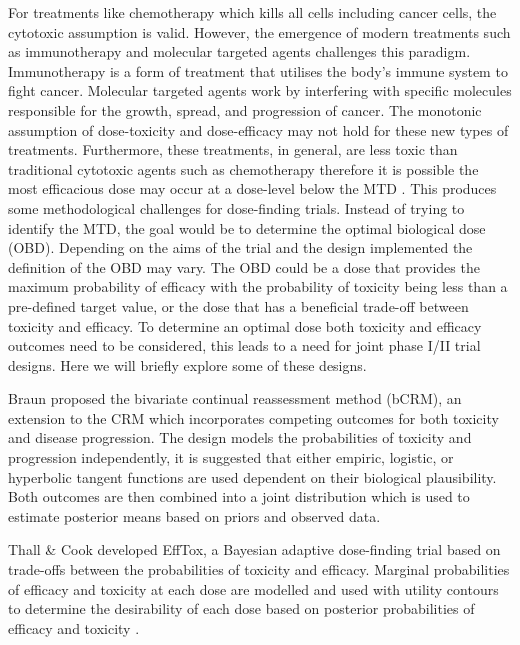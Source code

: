 For treatments like chemotherapy which kills all cells including cancer cells, the cytotoxic assumption is valid. However, the emergence of modern treatments such as immunotherapy and molecular targeted agents challenges this paradigm. Immunotherapy is a form of treatment that utilises the body's immune system to fight cancer. Molecular targeted agents work by interfering with specific molecules responsible for the growth, spread, and progression of cancer. The monotonic assumption of dose-toxicity and dose-efficacy may not hold for these new types of treatments. Furthermore, these treatments, in general, are less toxic than traditional cytotoxic agents such as chemotherapy therefore it is possible the most efficacious dose may occur at a dose-level below the MTD \cite{ahnOptimalBiologicalDose2016}. This produces some methodological challenges for dose-finding trials. Instead of trying to identify the MTD, the goal would be to determine the optimal biological dose (OBD). Depending on the aims of the trial and the design implemented the definition of the OBD may vary. The OBD could be a dose that provides the maximum probability of efficacy with the probability of toxicity being less than a pre-defined target value, or the dose that has a beneficial trade-off between toxicity and efficacy. To determine an optimal dose both toxicity and efficacy outcomes need to be considered, this leads to a need for joint phase \RN{1}/\RN{2} trial designs. Here we will briefly explore some of these designs. 

Braun \cite{braunBivariateContinualReassessment2002} proposed the bivariate continual reassessment method (bCRM), an extension to the CRM which incorporates competing outcomes for both toxicity and disease progression. The design models the probabilities of toxicity and progression independently, it is suggested that either empiric, logistic, or hyperbolic tangent functions are used dependent on their biological plausibility. Both outcomes are then combined into a joint distribution which is used to estimate posterior means based on priors and observed data. 

Thall \& Cook \cite{thallDosefindingBasedEfficacytoxicity2004} developed EffTox, a Bayesian adaptive dose-finding trial based on trade-offs between the probabilities of toxicity and efficacy. Marginal probabilities of efficacy and toxicity at each dose are modelled and used with utility contours to determine the desirability of each dose based on posterior probabilities of efficacy and toxicity \cite{brockImplementingEffToxDosefinding2017}. 

